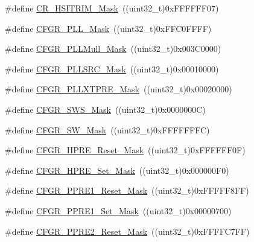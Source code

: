 \begin{DoxyCompactItemize}
\#define \hyperlink{group___r_c_c___private___defines_gac6a6adccdfb5a34541e2cdf01daf98ce}{C\+R\+\_\+\+H\+S\+I\+T\+R\+I\+M\+\_\+\+Mask}~((uint32\+\_\+t)0x\+F\+F\+F\+F\+F\+F07)
\item 
\#define \hyperlink{group___r_c_c___private___defines_gaea605b2eaea5332218130fc2d20d917c}{C\+F\+G\+R\+\_\+\+P\+L\+L\+\_\+\+Mask}~((uint32\+\_\+t)0x\+F\+F\+C0\+F\+F\+F\+F)
\item 
\#define \hyperlink{group___r_c_c___private___defines_ga26ac4de307d4c081867dc0344f54c17a}{C\+F\+G\+R\+\_\+\+P\+L\+L\+Mull\+\_\+\+Mask}~((uint32\+\_\+t)0x003\+C0000)
\item 
\#define \hyperlink{group___r_c_c___private___defines_ga8fd33db1092dfc565314b7bf395bba23}{C\+F\+G\+R\+\_\+\+P\+L\+L\+S\+R\+C\+\_\+\+Mask}~((uint32\+\_\+t)0x00010000)
\item 
\#define \hyperlink{group___r_c_c___private___defines_ga025835ddeb698b8c119ddf355b2fbded}{C\+F\+G\+R\+\_\+\+P\+L\+L\+X\+T\+P\+R\+E\+\_\+\+Mask}~((uint32\+\_\+t)0x00020000)
\item 
\#define \hyperlink{group___r_c_c___private___defines_gaefba904c88a72c7e2c12e8fcef38300a}{C\+F\+G\+R\+\_\+\+S\+W\+S\+\_\+\+Mask}~((uint32\+\_\+t)0x0000000\+C)
\item 
\#define \hyperlink{group___r_c_c___private___defines_ga41e0b286664f76c2057cffb134809c51}{C\+F\+G\+R\+\_\+\+S\+W\+\_\+\+Mask}~((uint32\+\_\+t)0x\+F\+F\+F\+F\+F\+F\+F\+C)
\item 
\#define \hyperlink{group___r_c_c___private___defines_ga55937d93be56562243d92c507145112c}{C\+F\+G\+R\+\_\+\+H\+P\+R\+E\+\_\+\+Reset\+\_\+\+Mask}~((uint32\+\_\+t)0x\+F\+F\+F\+F\+F\+F0\+F)
\item 
\#define \hyperlink{group___r_c_c___private___defines_gaca06c6cc484e08423a56cfca6928b9ae}{C\+F\+G\+R\+\_\+\+H\+P\+R\+E\+\_\+\+Set\+\_\+\+Mask}~((uint32\+\_\+t)0x000000\+F0)
\item 
\#define \hyperlink{group___r_c_c___private___defines_gab02d8032f451eb5a1d139007ff57f22e}{C\+F\+G\+R\+\_\+\+P\+P\+R\+E1\+\_\+\+Reset\+\_\+\+Mask}~((uint32\+\_\+t)0x\+F\+F\+F\+F\+F8\+F\+F)
\item 
\#define \hyperlink{group___r_c_c___private___defines_ga74838e1873c5e4c46eef61a81b1bd2c5}{C\+F\+G\+R\+\_\+\+P\+P\+R\+E1\+\_\+\+Set\+\_\+\+Mask}~((uint32\+\_\+t)0x00000700)
\item 
\#define \hyperlink{group___r_c_c___private___defines_gab2ee73d52f48cb201e493e381928d1ae}{C\+F\+G\+R\+\_\+\+P\+P\+R\+E2\+\_\+\+Reset\+\_\+\+Mask}~((uint32\+\_\+t)0x\+F\+F\+F\+F\+C7\+F\+F)

\end{DoxyCompactItemize}
